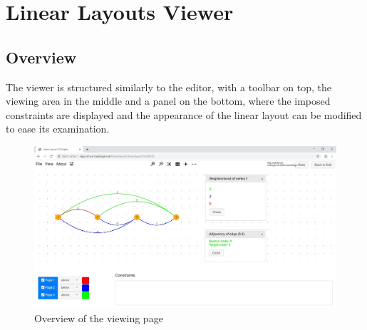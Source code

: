 \section{Linear Layouts Viewer}
\subsection{Overview}
The viewer is structured similarly to the editor, with a toolbar on top, the viewing area in the middle and a panel on the bottom, where the imposed constraints are displayed and the appearance of the linear layout can be modified to ease its examination.
\begin{figure}[!h]
\begin{center}
\includegraphics[width=1\textwidth]{figures/figSecond/OverviewSecond.jpg}
\caption{Overview of the viewing page}
\label{img:plzhltr}
\end{center}
\end{figure}
